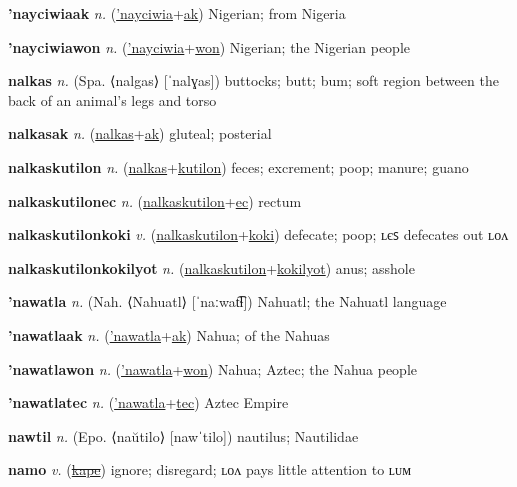\textbf{\hypertarget{'nayciwiaak}{'nayciwiaak}} \textit{n.} (\hyperlink{'nayciwia}{'nayciwia}+\allowbreak \hyperlink{ak}{ak})
Nigerian; from Nigeria

\textbf{\hypertarget{'nayciwiawon}{'nayciwiawon}} \textit{n.} (\hyperlink{'nayciwia}{'nayciwia}+\allowbreak \hyperlink{won}{won})
Nigerian; the Nigerian people

\textbf{\hypertarget{nalkas}{nalkas}} \textit{n.} (Spa. ⟨nalgas⟩ [ˈnalɣas])
buttocks; butt; bum; soft region between the back of an animal’s legs and torso

\textbf{\hypertarget{nalkasak}{nalkasak}} \textit{n.} (\hyperlink{nalkas}{nalkas}+\allowbreak \hyperlink{ak}{ak})
gluteal; posterial

\textbf{\hypertarget{nalkaskutilon}{nalkaskutilon}} \textit{n.} (\hyperlink{nalkas}{nalkas}+\allowbreak \hyperlink{kutilon}{kutilon})
feces; excrement; poop; manure; guano

\textbf{\hypertarget{nalkaskutilonec}{nalkaskutilonec}} \textit{n.} (\hyperlink{nalkaskutilon}{nalkaskutilon}+\allowbreak \hyperlink{ec}{ec})
rectum

\textbf{\hypertarget{nalkaskutilonkoki}{nalkaskutilonkoki}} \textit{v.} (\hyperlink{nalkaskutilon}{nalkaskutilon}+\allowbreak \hyperlink{koki}{koki})
defecate; poop; ʟєꜱ defecates out ʟᴏᴧ

\textbf{\hypertarget{nalkaskutilonkokilyot}{nalkaskutilonkokilyot}} \textit{n.} (\hyperlink{nalkaskutilon}{nalkaskutilon}+\allowbreak \hyperlink{kokilyot}{kokilyot})
anus; asshole

\textbf{\hypertarget{'nawatla}{'nawatla}} \textit{n.} (Nah. ⟨Nahuatl⟩ [ˈnaːwat͡ɬ])
Nahuatl; the Nahuatl language

\textbf{\hypertarget{'nawatlaak}{'nawatlaak}} \textit{n.} (\hyperlink{'nawatla}{'nawatla}+\allowbreak \hyperlink{ak}{ak})
Nahua; of the Nahuas

\textbf{\hypertarget{'nawatlawon}{'nawatlawon}} \textit{n.} (\hyperlink{'nawatla}{'nawatla}+\allowbreak \hyperlink{won}{won})
Nahua; Aztec; the Nahua people

\textbf{\hypertarget{'nawatlatec}{'nawatlatec}} \textit{n.} (\hyperlink{'nawatla}{'nawatla}+\allowbreak \hyperlink{tec}{tec})
Aztec Empire

\textbf{\hypertarget{nawtil}{nawtil}} \textit{n.} (Epo. ⟨naŭtilo⟩ [nawˈtilo])
nautilus; Nautilidae

\textbf{\hypertarget{namo}{namo}} \textit{v.} (\hyperlink{kape}{\sout{kape}})
ignore; disregard; ʟᴏᴧ pays little attention to ʟᴜᴍ

